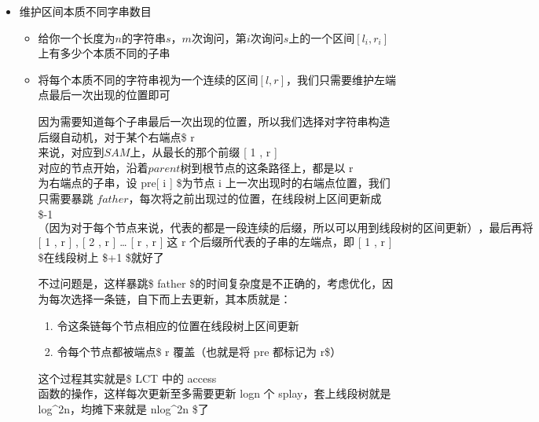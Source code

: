 \documentclass[]{article}
\providecommand{\tightlist}{%
  \setlength{\itemsep}{0pt}\setlength{\parskip}{0pt}}
\begin{document}
\begin{itemize}
\item
  维护区间本质不同字串数目

  \begin{itemize}
  \item
    给你一个长度为\(n\)的字符串\(s\)，\(m\)次询问，第\(i\)次询问\(s\)上的一个区间\([l_i,r_i]\)上有多少个本质不同的子串
  \item
    将每个本质不同的字符串视为一个连续的区间\([l,r]\)，我们只需要维护左端点最后一次出现的位置即可

    因为需要知道每个子串最后一次出现的位置，所以我们选择对字符串构造后缀自动机，对于某个右端点\$
    r \(来说，对应到 SAM 上，从最长的那个前缀\) {[} 1 , r {]}
    \(对应的节点开始，沿着 parent 树到根节点的这条路径上，都是以\) r
    \(为右端点的子串，设\) pre{[} i {]} \$为节点 i
    上一次出现时的右端点位置，我们只需要暴跳
    \(father\)，每次将之前出现过的位置，在线段树上区间更新成 \$-1
    \(（因为对于每个节点来说，代表的都是一段连续的后缀，所以可以用到线段树的区间更新），最后再将\)
    {[} 1 , r {]} , {[} 2 , r {]} \ldots{} {[} r , r {]} \(这\) r
    \(个后缀所代表的子串的左端点，即\) {[} 1 , r {]} \$在线段树上 \$+1
    \$就好了

    不过问题是，这样暴跳\$ father
    \$的时间复杂度是不正确的，考虑优化，因为每次选择一条链，自下而上去更新，其本质就是：

    \begin{enumerate}
    \def\labelenumi{\arabic{enumi}.}
    \tightlist
    \item
      令这条链每个节点相应的位置在线段树上区间更新
    \item
      令每个节点都被端点\$ r \(覆盖（也就是将\) pre \(都标记为\) r\$）
    \end{enumerate}

    这个过程其实就是\$ LCT \(中的\) access
    \(函数的操作，这样每次更新至多需要更新\) logn \(个\)
    splay\(，套上线段树就是\) log\^{}2n\(，均摊下来就是\) nlog\^{}2n
    \$了
  \end{itemize}
\end{itemize}
\end{document}
